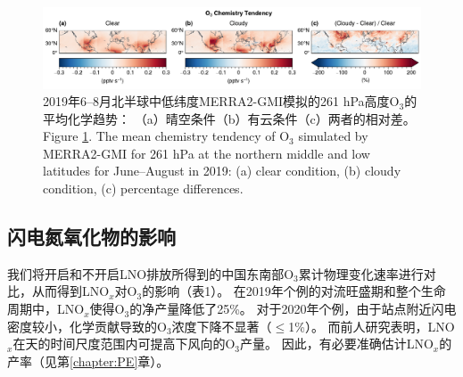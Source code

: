\begin{figure}[!htbp]
    \centering
    \includegraphics[width=15cm]{./figures/uto3_chem_tendency.pdf}
    \caption{
    2019年6--8月北半球中低纬度MERRA2-GMI模拟的261 hPa高度O$_3$的平均化学趋势：
    （a）晴空条件（b）有云条件（c）两者的相对差。\\
    Figure \ref{fig:uto3_chem_tendency}. The mean chemistry tendency of O$_3$ simulated by MERRA2-GMI for 261 hPa at the northern middle and low latitudes for June--August in 2019:
    (a) clear condition, (b) cloudy condition, (c) percentage differences.
    }
    \label{fig:uto3_chem_tendency}
\end{figure}


\subsection{闪电氮氧化物的影响}

我们将开启和不开启LNO排放所得到的中国东南部O$_3$累计物理变化速率进行对比，从而得到LNO$_x$对O$_3$的影响（表1）。
在2019年个例的对流旺盛期和整个生命周期中，LNO$_x$使得O$_3$的净产量降低了25\%。
对于2020年个例，由于站点附近闪电密度较小，化学贡献导致的O$_3$浓度下降不显著（$\leq$1\%）。
而前人研究表明，LNO$_x$在天的时间尺度范围内可提高下风向的O$_3$产量\citep{Pickering.1996,DeCaria.2005}。
因此，有必要准确估计LNO$_x$的产率（见第\ref{chapter:PE}章）。

